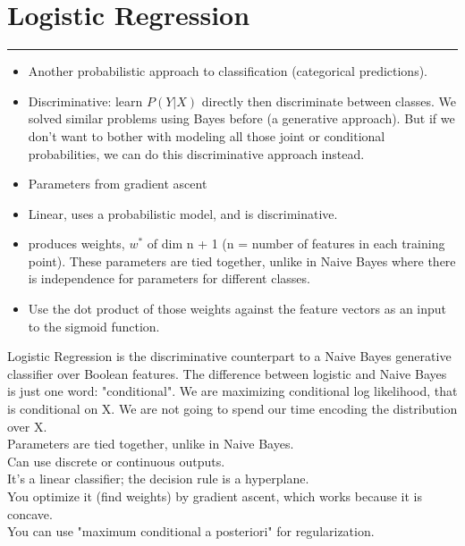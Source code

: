 \section{Logistic Regression}
\smallskip \hrule height 2pt \smallskip

\begin{itemize}
	\item Another probabilistic approach to classification (categorical predictions).  \hfill \\
	\item Discriminative: learn $P(Y|X)$ directly then discriminate between classes.    %
		We solved similar problems using Bayes before (a generative approach).  
	But if we don't want to bother with modeling all those joint or conditional probabilities, we can do this discriminative approach instead. \hfill \\  %
	\item Parameters from gradient ascent %
	\item Linear, uses a probabilistic model, and is discriminative.%
	\item produces weights, $w^*$ of dim n + 1 (n = number of features in each training point).
		These parameters are tied together, unlike in Naive Bayes where there is independence for parameters for different classes. 
	\item Use the dot product of those weights against the feature vectors as an input to the sigmoid function.
\end{itemize}

Logistic Regression is the discriminative counterpart to a Naive Bayes generative classifier over Boolean features.  %
The difference between logistic and Naive Bayes is just one word: "conditional".   %
We are maximizing conditional log likelihood, that is conditional on X.  
	We are not going to spend our time encoding the distribution over X.   %
\hfill \\   

Parameters are tied together, unlike in Naive Bayes.  %
\hfill \\

Can use discrete or continuous outputs. \hfill \\ %
It's a linear classifier; the decision rule is a hyperplane. \hfill \\  %
You optimize it (find weights) by gradient ascent, which works because it is concave.    \hfill \\  %
You can use "maximum conditional a posteriori" for regularization.    \hfill \\  %

